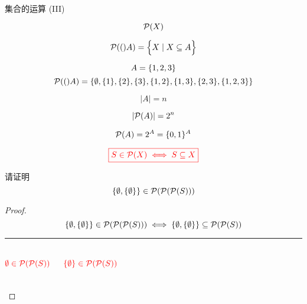 
\begin{frame}{}
  \begin{center}
    {\Large 集合的运算 (III)}
  \end{center}

  \[
    \mathcal{P}(X)
  \]
\end{frame}

\begin{frame}{}
  \begin{definition}[幂集 (Powerset)]
    \[
      \mathcal{P}(()A) = \Big\{X \mid X \subseteq A\Big\}
    \]
  \end{definition}

  \[
    A = \{1, 2, 3\}
  \]
  \[
    \mathcal{P}(()A) = \{\emptyset,
      \{1\}, \{2\}, \{3\},
      \{1, 2\}, \{1, 3\}, \{2, 3\},
      \{1, 2, 3\}\}
  \]
\end{frame}

\begin{frame}{}
  \[
    |A| = n
  \]

  \pause
  \[
    |\mathcal{P}(A)| = 2^{n}
  \]

  \pause

  \pause
  \[
    \mathcal{P}(A) = 2^{A} = \{0,1\}^{A}
  \]
\end{frame}

\begin{frame}{}
  \[
    \textcolor{red}{\boxed{S \in \mathcal{P}(X) \iff S \subseteq X}}
  \]
\end{frame}

\begin{frame}{}
  \begin{exampleblock}{请证明}
    \[
      \{\emptyset, \{\emptyset\}\} \in \mathcal{P}(\mathcal{P}(\mathcal{P}(S)))
    \]
  \end{exampleblock}

  \begin{proof}
    \pause
    \[
      \{\emptyset, \{\emptyset\}\} \in \mathcal{P}(\mathcal{P}(\mathcal{P}(S))) \iff \{\emptyset, \{\emptyset\}\} \subseteq \mathcal{P}(\mathcal{P}(S))
    \]

    \pause
    \hrule
    \begin{columns}
        \[
          \textcolor{red}{\emptyset \in \mathcal{P}(\mathcal{P}(S))}
        \]

        \[
          \textcolor{red}{\{\emptyset\} \in \mathcal{P}(\mathcal{P}(S))}
        \]
    \end{columns}
  \end{proof}
\end{frame}

